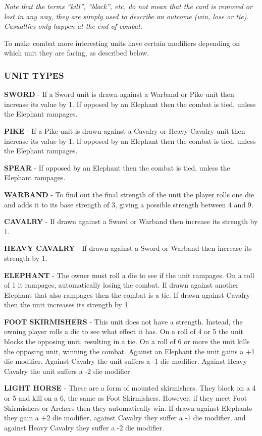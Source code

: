 \textit{Note that the terms “kill”, “block”, etc, do not mean that the card is removed or lost in any way, they are simply used to describe an outcome (win, lose or tie). Casualties only happen at the end of combat.}

To make combat more interesting units have certain modifiers depending on which unit they are facing, as described below.

\subsubsection{UNIT TYPES}

\textbf{SWORD} - If a Sword unit is drawn against a Warband or Pike unit then increase its value by 1. If opposed by an Elephant then the combat is tied, unless the Elephant rampages.

\textbf{PIKE} - If a Pike unit is drawn against a Cavalry or Heavy Cavalry unit then increase its value by 1. If opposed by an Elephant then the combat is tied, unless the Elephant rampages.

\textbf{SPEAR} - If opposed by an Elephant then the combat is tied, unless the Elephant rampages.

\textbf{WARBAND} - To find out the final strength of the unit the player rolls one die and adds it to its base strength of 3, giving a possible strength between 4 and 9.

\textbf{CAVALRY} - If drawn against a Sword or Warband then increase its strength by 1.

\textbf{HEAVY CAVALRY} - If drawn against a Sword or Warband then increase its strength by 1.

\textbf{ELEPHANT} - The owner must roll a die to see if the unit rampages. On a roll of 1 it rampages, automatically losing the combat. If drawn against another Elephant that also rampages then the combat is a tie. If drawn against Cavalry then the unit increases its strength by 1.

\textbf{FOOT SKIRMISHERS} - This unit does not have a strength. Instead, the owning player rolls a die to see what effect it has. On a roll of 4 or 5 the unit blocks the opposing unit, resulting in a tie. On a roll of 6 or more the unit kills the opposing unit, winning the combat. Against an Elephant the unit gains a +1 die modifier. Against Cavalry the unit suffers a -1 die modifier. Against Heavy Cavalry the unit suffers a -2 die modifier.

\textbf{LIGHT HORSE} - These are a form of mounted skirmishers. They block on a 4 or 5 and kill on a 6, the same as Foot Skirmishers. However, if they meet Foot Skirmishers or Archers then they automatically win. If drawn against Elephants they gain a +2 die modifier, against Cavalry they suffer a -1 die modifier, and against Heavy Cavalry they suffer a -2 die modifier.

